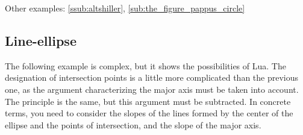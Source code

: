 Other examples: \ref{ssub:altshiller}, \ref{sub:the_figure_pappus_circle}

\newpage
\subsection{Line-ellipse} %
\label{sub:line_ellipse}
The following example is complex, but it shows the possibilities of Lua.
The designation of intersection points is a little more complicated than the previous one, as the argument characterizing the major axis must be taken into account.  The principle is the same, but this argument must be subtracted. In concrete terms, you need to consider the slopes of the lines formed by the center of the ellipse and the points of intersection, and the slope of the major axis.
\vspace{1em}

